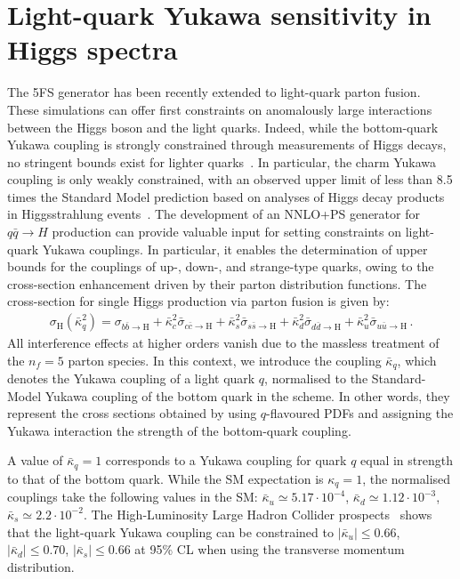 \documentclass[11pt,a4paper]{article}
\begin{document}
\section{Light-quark Yukawa sensitivity in Higgs spectra}
The \minnlo{} 5FS generator has been recently extended to light-quark parton fusion. These simulations can offer first constraints on anomalously large interactions between the Higgs boson and the light quarks. Indeed, while the bottom-quark Yukawa coupling is strongly constrained through measurements of Higgs decays, no stringent bounds exist for lighter quarks~\cite{Kagan:2014ila}. In particular, the charm Yukawa coupling is only weakly constrained, with an observed upper limit of less than 8.5 times the Standard Model prediction based on analyses of Higgs decay products in Higgsstrahlung events~\cite{Atlas:2022ers}. The development of an NNLO+PS generator for \( q\bar{q} \rightarrow H \) production can provide valuable input for setting constraints on light-quark Yukawa couplings. In particular, it enables the determination of upper bounds for the couplings of up-, down-, and strange-type quarks, owing to the cross-section enhancement driven by their parton distribution functions. 
The cross-section for single Higgs production via parton fusion is given by:
\begin{align}
	\sigma_{\text{H}}(\bar \kappa_q^2)=\sigma_{b\bar b \rightarrow \text{H}}+\bar \kappa_c^2 \bar \sigma_{c\bar c \rightarrow \text{H}}+\bar \kappa_s^2 \bar \sigma_{s\bar s \rightarrow \text{H}}+\bar \kappa_d^2 \bar \sigma_{d\bar d \rightarrow \text{H}}+\bar \kappa_u^2 \bar \sigma_{u\bar u \rightarrow \text{H}}\,.
\end{align}
All interference effects at higher orders vanish due to the massless treatment of the \( n_f = 5 \) parton species. In this context, we introduce the coupling \( \bar\kappa_q \), which denotes the Yukawa coupling of a light quark \( q \), normalised to the Standard-Model Yukawa coupling of the bottom quark in the \MSbar{} scheme. In other words, they represent the cross sections obtained by using \( q \)-flavoured PDFs and assigning the Yukawa interaction the strength of the bottom-quark coupling.

A value of \( \bar\kappa_q = 1 \) corresponds to a Yukawa coupling for quark \( q \) equal in strength to that of the bottom quark. While the SM expectation is \( \kappa_q = 1 \), the normalised couplings take the following values in the SM:  
\( \bar \kappa_u \simeq 5.17 \cdot 10^{-4} \),  
\( \bar \kappa_d \simeq 1.12 \cdot 10^{-3} \),  
\( \bar \kappa_s \simeq 2.2 \cdot 10^{-2} \).
The High-Luminosity Large Hadron Collider prospects~\cite{deBlas:2019rxi} shows that the light-quark Yukawa coupling can be constrained to $|\bar \kappa_u|\leq 0.66$, $|\bar \kappa_d|\leq 0.70$, $|\bar \kappa_s|\leq 0.66$ at 95\% CL when using the transverse momentum distribution.
\end{document}
